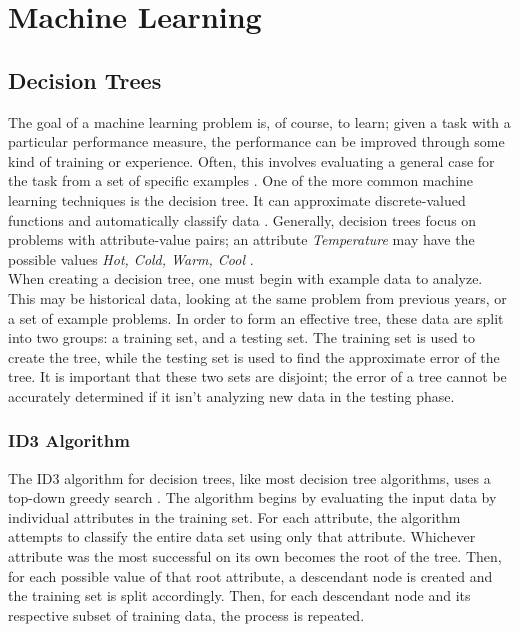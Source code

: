 \chapter{Machine Learning}
\section{Decision Trees}
The goal of a machine learning problem is, of course, to learn; given a task with a particular performance measure, the performance can be improved through some kind of training or experience. Often, this involves evaluating a general case for the task from a set of specific examples \cite{mitc97}. One of the more common machine learning techniques is the decision tree. It can approximate discrete-valued functions \cite{mitc97} and automatically classify data \cite{sega07}. Generally, decision trees focus on problems with attribute-value pairs; an attribute \textit{Temperature} may have the possible values \textit{Hot, Cold, Warm, Cool} \cite{mitc97}.\\

When creating a decision tree, one must begin with example data to analyze. This may be historical data, looking at the same problem from previous years, or a set of example problems. In order to form an effective tree, these data are split into two groups: a training set, and a testing set. The training set is used to create the tree, while the testing set is used to find the approximate error of the tree. It is important that these two sets are disjoint; the error of a tree cannot be accurately determined if it isn't analyzing new data in the testing phase.

\subsection{ID3 Algorithm}
The ID3 algorithm for decision trees, like most decision tree algorithms, uses a top-down greedy search \cite{mitc97}. The algorithm begins by evaluating the input data by individual attributes in the training set. For each attribute, the algorithm attempts to classify the entire data set using only that attribute. Whichever attribute was the most successful on its own becomes the root of the tree. Then, for each possible value of that root attribute, a descendant node is created and the training set is split accordingly. Then, for each descendant node and its respective subset of training data, the process is repeated.\\

